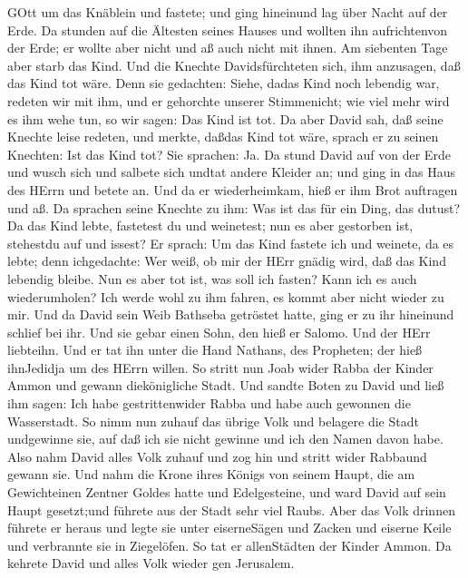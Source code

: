 GOtt um das Knäblein und fastete; und ging hineinund lag über Nacht auf
der Erde.  Da stunden auf die Ältesten seines Hauses und
wollten ihn aufrichtenvon der Erde; er wollte aber nicht und aß auch
nicht mit ihnen.  Am siebenten Tage aber starb das Kind.
Und die Knechte Davidsfürchteten sich, ihm anzusagen, daß das Kind tot
wäre. Denn sie gedachten: Siehe, dadas Kind noch lebendig war, redeten
wir mit ihm, und er gehorchte unserer Stimmenicht; wie viel mehr wird es
ihm wehe tun, so wir sagen: Das Kind ist tot.  Da aber
David sah, daß seine Knechte leise redeten, und merkte, daßdas Kind tot
wäre, sprach er zu seinen Knechten: Ist das Kind tot? Sie sprachen: Ja.
 Da stund David auf von der Erde und wusch sich und salbete
sich undtat andere Kleider an; und ging in das Haus des HErrn und betete
an. Und da er wiederheimkam, hieß er ihm Brot auftragen und aß.
 Da sprachen seine Knechte zu ihm: Was ist das für ein
Ding, das dutust? Da das Kind lebte, fastetest du und weinetest; nun es
aber gestorben ist, stehestdu auf und issest?  Er sprach:
Um das Kind fastete ich und weinete, da es lebte; denn ichgedachte: Wer
weiß, ob mir der HErr gnädig wird, daß das Kind lebendig bleibe.
 Nun es aber tot ist, was soll ich fasten? Kann ich es auch
wiederumholen? Ich werde wohl zu ihm fahren, es kommt aber nicht wieder
zu mir.  Und da David sein Weib Bathseba getröstet hatte,
ging er zu ihr hineinund schlief bei ihr. Und sie gebar einen Sohn, den
hieß er Salomo. Und der HErr liebteihn.  Und er tat ihn
unter die Hand Nathans, des Propheten; der hieß ihnJedidja um des HErrn
willen.  So stritt nun Joab wider Rabba der Kinder Ammon
und gewann diekönigliche Stadt.  Und sandte Boten zu David
und ließ ihm sagen: Ich habe gestrittenwider Rabba und habe auch
gewonnen die Wasserstadt.  So nimm nun zuhauf das übrige
Volk und belagere die Stadt undgewinne sie, auf daß ich sie nicht
gewinne und ich den Namen davon habe.  Also nahm David
alles Volk zuhauf und zog hin und stritt wider Rabbaund gewann sie.
 Und nahm die Krone ihres Königs von seinem Haupt, die am
Gewichteinen Zentner Goldes hatte und Edelgesteine, und ward David auf
sein Haupt gesetzt;und führete aus der Stadt sehr viel Raubs.
 Aber das Volk drinnen führete er heraus und legte sie
unter eiserneSägen und Zacken und eiserne Keile und verbrannte sie in
Ziegelöfen. So tat er allenStädten der Kinder Ammon. Da kehrete David
und alles Volk wieder gen Jerusalem.

